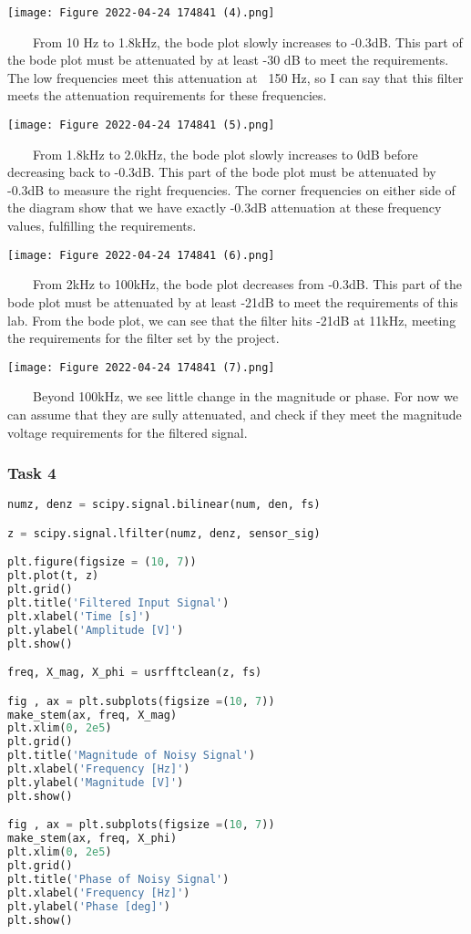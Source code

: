 \documentclass[11pt,a4]{article}
\begin{document}
\texttt{[image: Figure 2022-04-24 174841 (4).png]}

\ \ \ \ From 10 Hz to 1.8kHz, the bode plot slowly increases to -0.3dB. This part of the bode plot must be attenuated by at least -30 dB to meet the requirements. The low frequencies meet this attenuation at ~150 Hz, so I can say that this filter meets the attenuation requirements for these frequencies.

\texttt{[image: Figure 2022-04-24 174841 (5).png]}

\ \ \ \ From 1.8kHz to 2.0kHz, the bode plot slowly increases to 0dB before decreasing back to -0.3dB. This part of the bode plot must be attenuated by -0.3dB to measure the right frequencies. The corner frequencies on either side of the diagram show that we have exactly -0.3dB attenuation at these frequency values, fulfilling the requirements.

\texttt{[image: Figure 2022-04-24 174841 (6).png]}

\ \ \ \ From 2kHz to 100kHz, the bode plot decreases from -0.3dB. This part of the bode plot must be attenuated by at least -21dB to meet the requirements of this lab. From the bode plot, we can see that the filter hits -21dB at 11kHz, meeting the requirements for the filter set by the project.

\texttt{[image: Figure 2022-04-24 174841 (7).png]}

\ \ \ \ Beyond 100kHz, we see little change in the magnitude or phase. For now we can assume that they are sully attenuated, and check if they meet the magnitude voltage requirements for the filtered signal.

\subsubsection{Task 4}

\begin{lstlisting}[language=Python]
numz, denz = scipy.signal.bilinear(num, den, fs)

z = scipy.signal.lfilter(numz, denz, sensor_sig)

plt.figure(figsize = (10, 7))
plt.plot(t, z)
plt.grid()
plt.title('Filtered Input Signal')
plt.xlabel('Time [s]')
plt.ylabel('Amplitude [V]')
plt.show()

freq, X_mag, X_phi = usrfftclean(z, fs)

fig , ax = plt.subplots(figsize =(10, 7))
make_stem(ax, freq, X_mag)
plt.xlim(0, 2e5)
plt.grid()
plt.title('Magnitude of Noisy Signal')
plt.xlabel('Frequency [Hz]')
plt.ylabel('Magnitude [V]')
plt.show()

fig , ax = plt.subplots(figsize =(10, 7))
make_stem(ax, freq, X_phi)
plt.xlim(0, 2e5)
plt.grid()
plt.title('Phase of Noisy Signal')
plt.xlabel('Frequency [Hz]')
plt.ylabel('Phase [deg]')
plt.show()
\end{lstlisting}
\end{document}
